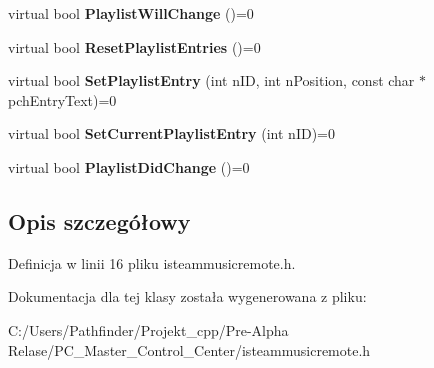 \begin{DoxyCompactItemize}
virtual bool {\bfseries Playlist\+Will\+Change} ()=0
\item 
\mbox{\label{class_i_steam_music_remote_a11f6cfc2a0c36ce43cd07f983292f2ce}} 
virtual bool {\bfseries Reset\+Playlist\+Entries} ()=0
\item 
\mbox{\label{class_i_steam_music_remote_a8fadd2d55499efcd4c6bef76dd4edc2d}} 
virtual bool {\bfseries Set\+Playlist\+Entry} (int n\+ID, int n\+Position, const char $\ast$pch\+Entry\+Text)=0
\item 
\mbox{\label{class_i_steam_music_remote_a85d935efa2124ab4432313ac1dcf33c0}} 
virtual bool {\bfseries Set\+Current\+Playlist\+Entry} (int n\+ID)=0
\item 
\mbox{\label{class_i_steam_music_remote_a64b1f8d04514e877cbb5b7136f49a0bf}} 
virtual bool {\bfseries Playlist\+Did\+Change} ()=0
\end{DoxyCompactItemize}


\subsection{Opis szczegółowy}


Definicja w linii 16 pliku isteammusicremote.\+h.



Dokumentacja dla tej klasy została wygenerowana z pliku\+:\begin{DoxyCompactItemize}
\item 
C\+:/\+Users/\+Pathfinder/\+Projekt\+\_\+cpp/\+Pre-\/\+Alpha Relase/\+P\+C\+\_\+\+Master\+\_\+\+Control\+\_\+\+Center/isteammusicremote.\+h\end{DoxyCompactItemize}
